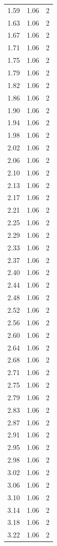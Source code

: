 \begin{longtable}{lrr}
  1.59 & 1.06 & 2 \\
  1.63 & 1.06 & 2 \\
  1.67 & 1.06 & 2 \\
  1.71 & 1.06 & 2 \\
  1.75 & 1.06 & 2 \\
  1.79 & 1.06 & 2 \\
  1.82 & 1.06 & 2 \\
  1.86 & 1.06 & 2 \\
  1.90 & 1.06 & 2 \\
  1.94 & 1.06 & 2 \\
  1.98 & 1.06 & 2 \\
  2.02 & 1.06 & 2 \\
  2.06 & 1.06 & 2 \\
  2.10 & 1.06 & 2 \\
  2.13 & 1.06 & 2 \\
  2.17 & 1.06 & 2 \\
  2.21 & 1.06 & 2 \\
  2.25 & 1.06 & 2 \\
  2.29 & 1.06 & 2 \\
  2.33 & 1.06 & 2 \\
  2.37 & 1.06 & 2 \\
  2.40 & 1.06 & 2 \\
  2.44 & 1.06 & 2 \\
  2.48 & 1.06 & 2 \\
  2.52 & 1.06 & 2 \\
  2.56 & 1.06 & 2 \\
  2.60 & 1.06 & 2 \\
  2.64 & 1.06 & 2 \\
  2.68 & 1.06 & 2 \\
  2.71 & 1.06 & 2 \\
  2.75 & 1.06 & 2 \\
  2.79 & 1.06 & 2 \\
  2.83 & 1.06 & 2 \\
  2.87 & 1.06 & 2 \\
  2.91 & 1.06 & 2 \\
  2.95 & 1.06 & 2 \\
  2.98 & 1.06 & 2 \\
  3.02 & 1.06 & 2 \\
  3.06 & 1.06 & 2 \\
  3.10 & 1.06 & 2 \\
  3.14 & 1.06 & 2 \\
  3.18 & 1.06 & 2 \\
  3.22 & 1.06 & 2 \\

\end{longtable}
